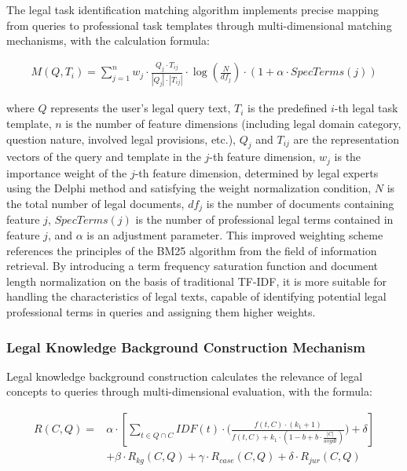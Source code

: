\documentclass{article}
\theoremstyle{plain}
\theoremstyle{definition}
\begin{document}
The legal task identification matching algorithm implements precise mapping from queries to professional task templates through multi-dimensional matching mechanisms, with the calculation formula:

\begin{equation}
\begin{split}
M(Q, T_i) = \sum_{j=1}^{n} w_j \cdot \frac{Q_j \cdot T_{ij}}{|Q_j| \cdot |T_{ij}|} \cdot \log\left(\frac{N}{df_j}\right) \cdot (1 + \alpha \cdot SpecTerms(j))
\end{split}
\end{equation}

where $Q$ represents the user's legal query text, $T_i$ is the predefined $i$-th legal task template, $n$ is the number of feature dimensions (including legal domain category, question nature, involved legal provisions, etc.), $Q_j$ and $T_{ij}$ are the representation vectors of the query and template in the $j$-th feature dimension, $w_j$ is the importance weight of the $j$-th feature dimension, determined by legal experts using the Delphi method and satisfying the weight normalization condition, $N$ is the total number of legal documents, $df_j$ is the number of documents containing feature $j$, $SpecTerms(j)$ is the number of professional legal terms contained in feature $j$, and $\alpha$ is an adjustment parameter. This improved weighting scheme references the principles of the BM25 algorithm from the field of information retrieval. By introducing a term frequency saturation function and document length normalization on the basis of traditional TF-IDF, it is more suitable for handling the characteristics of legal texts, capable of identifying potential legal professional terms in queries and assigning them higher weights.

\subsubsection{Legal Knowledge Background Construction Mechanism}
\label{sec3.1.2}

Legal knowledge background construction calculates the relevance of legal concepts to queries through multi-dimensional evaluation, with the formula:

\begin{equation}
\begin{split}
R(C, Q) = {} & \alpha \cdot \left[ \sum_{t \in Q \cap C} IDF(t) \cdot \biggl(\frac{f(t, C) \cdot (k_1+1)}{f(t, C) + k_1 \cdot (1-b+b \cdot \frac{|C|}{avgdl})} \biggr) + \delta \right] \\
             & + \beta \cdot R_{kg}(C, Q) + \gamma \cdot R_{case}(C, Q) + \delta \cdot R_{jur}(C, Q)
\end{split}
\end{equation}
\end{document}
